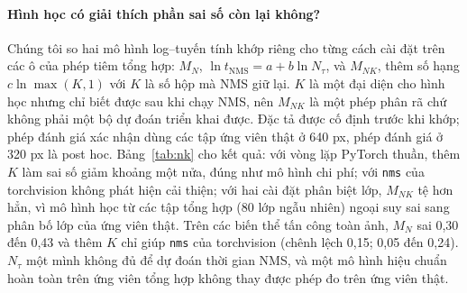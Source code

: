 \documentclass[a4paper,fleqn]{cas-dc}
\newcommand{\Ntau}{N_{\tau}}
\begin{document}
\paragraph{Hình học có giải thích phần sai số còn lại không?}
\label{sec:nk}
Chúng tôi so hai mô hình log--tuyến tính khớp riêng cho từng cách cài đặt trên các ô của phép tiêm tổng hợp: $M_N$, $\ln t_{\mathrm{NMS}} = a + b\ln\Ntau$, và $M_{NK}$, thêm số hạng $c\ln\max(K,1)$ với $K$ là số hộp mà NMS giữ lại. $K$ là một đại diện cho hình học nhưng chỉ biết được sau khi chạy NMS, nên $M_{NK}$ là một phép phân rã chứ không phải một bộ dự đoán triển khai được. Đặc tả được cố định trước khi khớp; phép đánh giá xác nhận dùng các tập ứng viên thật ở 640 px, phép đánh giá ở 320 px là post hoc. Bảng~\ref{tab:nk} cho kết quả: với vòng lặp PyTorch thuần, thêm $K$ làm sai số giảm khoảng một nửa, đúng như mô hình chi phí; với \texttt{nms} của torchvision không phát hiện cải thiện; với hai cài đặt phân biệt lớp, $M_{NK}$ tệ hơn hẳn, vì mô hình học từ các tập tổng hợp (80 lớp ngẫu nhiên) ngoại suy sai sang phân bố lớp của ứng viên thật. Trên các biến thể tấn công toàn ảnh, $M_N$ sai 0,30 đến 0,43 và thêm $K$ chỉ giúp \texttt{nms} của torchvision (chênh lệch 0,15; 0,05 đến 0,24). $\Ntau$ một mình không đủ để dự đoán thời gian NMS, và một mô hình hiệu chuẩn hoàn toàn trên ứng viên tổng hợp không thay được phép đo trên ứng viên thật.
\end{document}
